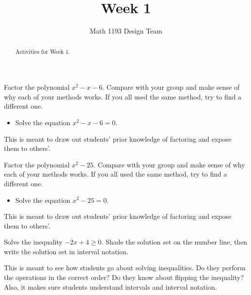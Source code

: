 \documentclass[noauthor,noinstructornotes]{ximera}
\title{Week 1}
\author{Math 1193 Design Team}
\begin{document}
\begin{abstract}
    Activities for Week 1.
\end{abstract}
\maketitle

\begin{problem}
    Factor the polynomial \(x^2 - x - 6\). Compare with 
your group and make sense of why each of your methods
works. If you all used the same method, try to find
a different one.
    \begin{itemize}
        \item Solve the equation \(x^2 - x - 6 = 0\).
    \end{itemize}

\begin{instructorNotes}
This is meant to draw out students' prior knowledge of factoring and expose them to others'.
\end{instructorNotes}
\end{problem}

\begin{problem}
Factor the polynomial \(x^2 - 25\). Compare with 
your group and make sense of why each of your methods
works. If you all used the same method, try to find
a different one.
    \begin{itemize}
        \item Solve the equation \(x^2 - 25 = 0\).
    \end{itemize}

\begin{instructorNotes}
This is meant to draw out students' prior knowledge of factoring and expose them to others'.
\end{instructorNotes}
\end{problem}

\begin{problem}
Solve the inequality \(-2x + 4 \ge 0\). Shade the 
solution set on the number line, then write the 
solution set in interval notation.

\begin{instructorNotes}
This is meant to see how students go about solving inequalities. 
Do they perform the operations in the correct order? Do they know 
about flipping the inequality? Also, it makes sure students understand 
intervals and interval notation.
\end{instructorNotes}
\end{problem}
\end{document}
